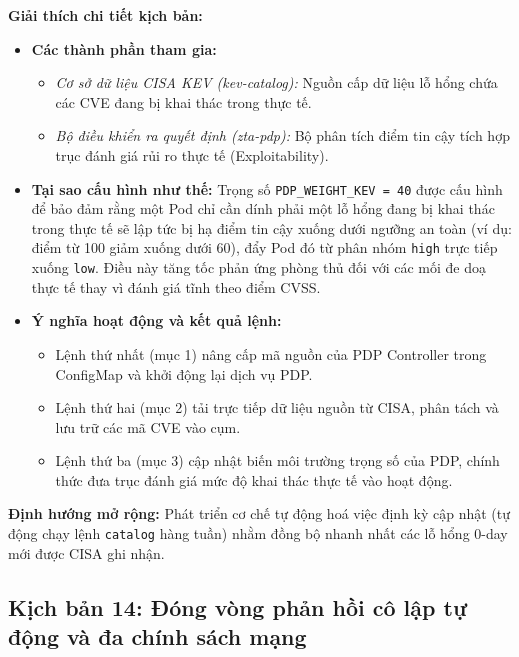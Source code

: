 \textbf{Giải thích chi tiết kịch bản:}
\begin{itemize}[itemsep=4pt, parsep=0pt]
    \item \textbf{Các thành phần tham gia:}
    \begin{itemize}
        \item \textit{Cơ sở dữ liệu CISA KEV (kev-catalog):} Nguồn cấp dữ liệu lỗ hổng chứa các CVE đang bị khai thác trong thực tế.
        \item \textit{Bộ điều khiển ra quyết định (zta-pdp):} Bộ phân tích điểm tin cậy tích hợp trục đánh giá rủi ro thực tế (Exploitability).
    \end{itemize}
    \item \textbf{Tại sao cấu hình như thế:} Trọng số \texttt{PDP\_WEIGHT\_KEV = 40} được cấu hình để bảo đảm rằng một Pod chỉ cần dính phải một lỗ hổng đang bị khai thác trong thực tế sẽ lập tức bị hạ điểm tin cậy xuống dưới ngưỡng an toàn (ví dụ: điểm từ 100 giảm xuống dưới 60), đẩy Pod đó từ phân nhóm \texttt{high} trực tiếp xuống \texttt{low}. Điều này tăng tốc phản ứng phòng thủ đối với các mối đe doạ thực tế thay vì đánh giá tĩnh theo điểm CVSS.
    \item \textbf{Ý nghĩa hoạt động và kết quả lệnh:} 
    \begin{itemize}
        \item Lệnh thứ nhất (mục 1) nâng cấp mã nguồn của PDP Controller trong ConfigMap và khởi động lại dịch vụ PDP.
        \item Lệnh thứ hai (mục 2) tải trực tiếp dữ liệu nguồn từ CISA, phân tách và lưu trữ các mã CVE vào cụm.
        \item Lệnh thứ ba (mục 3) cập nhật biến môi trường trọng số của PDP, chính thức đưa trục đánh giá mức độ khai thác thực tế vào hoạt động.
    \end{itemize}
\end{itemize}

\textbf{Định hướng mở rộng:} Phát triển cơ chế tự động hoá việc định kỳ cập nhật (tự động chạy lệnh \texttt{catalog} hàng tuần) nhằm đồng bộ nhanh nhất các lỗ hổng 0-day mới được CISA ghi nhận.


\subsection{Kịch bản 14: Đóng vòng phản hồi cô lập tự động và đa chính sách mạng}
\label{subsec:c3_kb14}

